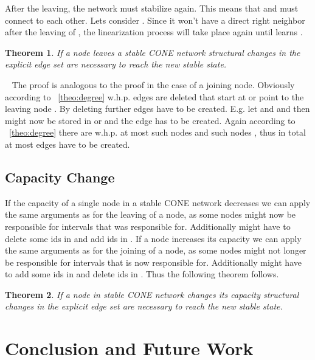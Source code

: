 \documentclass[11pt]{article}
\newtheorem{theorem}{Theorem}[section]
\newcommand{\sq}{\hbox{\rlap{}}}
\newcommand{\qed}{\hspace*{\fill}\sq}
\newenvironment{proof}{\noindent {\bf Proof.}\ }{\qed\par\vskip 4mm\par}
\begin{document}
After the leaving, the network must stabilize again.
This means that  and  must connect to each other. Lets consider . Since it won't have a direct right neighbor after the leaving of , the linearization process will take place again until  learns .

\begin{theorem}
If a node  leaves a stable CONE network  structural changes in the explicit edge set are necessary to reach the new stable state.
\end{theorem}

\begin{proof}
The proof is analogous to the proof in the case of a joining node. Obviously according to ~\ref{theo:degree} w.h.p.  edges are deleted that start at or point to the leaving node . By deleting  further edges have to be created. E.g. let  and  and  then  might now be stored in  or  and the edge  has to be created. Again according to ~\ref{theo:degree} there are w.h.p. at most  such nodes  and   such nodes , thus in total at most  edges have to be created.
\end{proof}





\subsection{Capacity Change}
If the capacity of a single node  in a stable CONE network decreases we can apply the same arguments as for the leaving of a node, as some nodes might now be responsible for intervals that  was responsible for. Additionally  might have to delete some ids in  and add ids in . If a node increases its capacity we can apply the same arguments as for the joining of a node, as some nodes might not longer be responsible for intervals that  is now responsible for. Additionally  might have to add some ids in  and delete ids in . Thus the following theorem follows.

\begin{theorem}
If a node  in stable CONE network changes its capacity  structural changes in the explicit edge set are necessary to reach the new stable state.
\end{theorem}




\section{Conclusion and Future Work}
\end{document}
